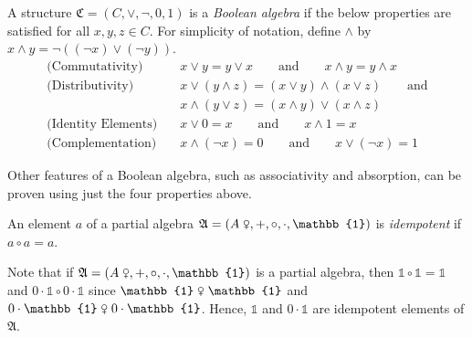 \documentclass{scrartcl}
\newcommand{\FA}{\mathfrak{A}}
\newcommand{\com}{\mathrel{\venus}}
\begin{document}
\begin{definition}
A structure $\mathfrak{C}=(C,\lor,\neg,0,1)$ is a \emph{Boolean algebra} if the below properties are satisfied for all $x,y,z\in C$. For simplicity of notation, define $\land$ by $x\land y=\neg((\neg x)\lor(\neg y))$.
\begin{align*}
\text{(Commutativity)} &\quad x\lor y=y\lor x \qquad\text{and}\qquad x\land y=y\land x\\
\text{(Distributivity)} &\quad x\lor(y\land z)=(x\lor y)\land(x\lor z)\qquad\text{and}\\
&\quad x\land(y\lor z)=(x\land y)\lor(x\land z)\\
\text{(Identity Elements)} &\quad x\lor0=x \qquad\text{and}\qquad x\land1=x\\
\text{(Complementation)} &\quad x\land(\neg x)=0 \qquad\text{and}\qquad x\lor(\neg x)=1
\end{align*}
\end{definition}

\begin{remark}
Other features of a Boolean algebra, such as associativity and absorption, can be proven using just the four properties above.
\end{remark}


\begin{definition}
An element $a$ of a partial algebra $\FA=(A\com,+,\circ,\cdot,\mathbb{1})$ is \emph{idempotent} if $a\circ a=a$.
\end{definition}

\begin{remark}
Note that if $\FA=(A\com,+,\circ,\cdot,\mathbb{1})$ is a partial algebra, then $\mathbb{1}\circ\mathbb{1}=\mathbb{1}$ and
$0\cdot\mathbb{1}\circ0\cdot\mathbb{1}$ since
$\mathbb{1}\com\mathbb{1}$
and
$0\cdot\mathbb{1}\com0\cdot\mathbb{1}$. 
Hence,
$\mathbb{1}$ and
$0\cdot\mathbb{1}$ are idempotent elements of $\FA$.

\end{remark}
\end{document}
